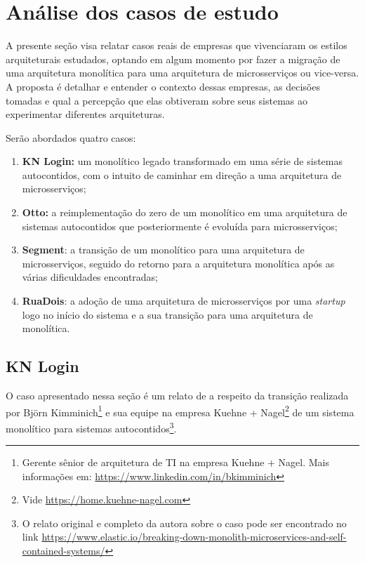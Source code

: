 \chapter{Análise dos casos de estudo}

A presente seção visa relatar casos reais de empresas que vivenciaram os estilos arquiteturais
estudados, optando em algum momento por fazer a migração de uma arquitetura monolítica para uma
arquitetura de microsserviços ou vice-versa. A proposta é detalhar e entender o contexto dessas empresas,
as decisões tomadas e qual a percepção que elas obtiveram sobre seus sistemas ao experimentar diferentes
arquiteturas.

Serão abordados quatro casos:

\begin{enumerate}
    \item \textbf{KN Login:} um monolítico legado transformado em uma série de sistemas
        autocontidos, com o intuito de caminhar em direção a uma arquitetura de microsserviços;
    \item \textbf{Otto:} a reimplementação do zero de um monolítico em uma arquitetura de sistemas
        autocontidos que posteriormente é evoluída para microsserviços;
    \item \textbf{Segment}: a transição de um monolítico para uma arquitetura de microsserviços,
        seguido do retorno para a arquitetura monolítica após as várias dificuldades encontradas;
    \item \textbf{RuaDois}: a adoção de uma arquitetura de microsserviços por uma \textit{startup}
        logo no início do sistema e a sua transição para uma arquitetura de monolítica.
\end{enumerate}

\section{KN Login}
\label{sec:KNLogin}

O caso apresentado nessa seção é um relato de  a respeito
da transição realizada por Björn Kimminich\footnote{Gerente sênior de arquitetura de TI na empresa
Kuehne + Nagel. Mais informações em: \url{https://www.linkedin.com/in/bkimminich}} e sua equipe na empresa
Kuehne + Nagel\footnote{Vide \url{https://home.kuehne-nagel.com}} de um sistema monolítico para sistemas
autocontidos\footnote{O relato original e completo da autora sobre o caso pode ser encontrado no link
\url{https://www.elastic.io/breaking-down-monolith-microservices-and-self-contained-systems/}}. 

